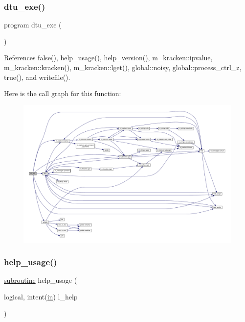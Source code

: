 \subsubsection{\texorpdfstring{dtu\+\_\+exe()}{dtu\_exe()}}
{\footnotesize\ttfamily program dtu\+\_\+exe (\begin{DoxyParamCaption}{ }\end{DoxyParamCaption})}



References false(), help\+\_\+usage(), help\+\_\+version(), m\+\_\+kracken\+::ipvalue, m\+\_\+kracken\+::kracken(), m\+\_\+kracken\+::lget(), global\+::noisy, global\+::process\+\_\+ctrl\+\_\+z, true(), and writefile().

Here is the call graph for this function\+:
\nopagebreak
\begin{figure}[H]
\begin{center}
\leavevmode
\includegraphics[width=350pt]{dtu_8f90_abff0f15f5d5e680978944e8d3530395a_cgraph}
\end{center}
\end{figure}
\mbox{\label{dtu_8f90_a3e09a3b52ee8fb04eeb93fe5761626a8}} 
\subsubsection{\texorpdfstring{help\+\_\+usage()}{help\_usage()}}
{\footnotesize\ttfamily \hyperlink{M__stopwatch_83_8txt_acfbcff50169d691ff02d4a123ed70482}{subroutine} help\+\_\+usage (\begin{DoxyParamCaption}\item[{logical, intent(\hyperlink{M__journal_83_8txt_afce72651d1eed785a2132bee863b2f38}{in})}]{l\+\_\+help }\end{DoxyParamCaption})}



